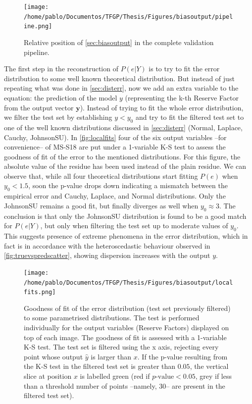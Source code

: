 \begin{figure}[!htb]
	\centering
	\texttt{[image: /home/pablo/Documentos/TFGP/Thesis/Figures/biasoutput/pipeline.png]}
	\caption{Relative position of \autoref{sec:biasoutput} in the complete validation pipeline.}
	\label{fig:boutpipeline}
\end{figure}

%
\indent The first step in the reconstruction of $P(e|Y)$ is to try to fit the error distribution to some well known theoretical distribution. But instead of just repeating what was done in \autoref{sec:disterr}, now we add an extra variable to the equation: the prediction of the model ${y}$ (representing the k-th Reserve Factor from the output vector $\mathbf{y}$). Instead of trying to fit the whole error distribution, we filter the test set by establishing ${y}<{y}_0$ and try to fit the filtered test set to one of the well known distributions discussed in \autoref{sec:disterr} (Normal, Laplace, Cauchy, JohnsonSU). In \autoref{fig:localfits} four of the six output variables --for convenience-- of MS-S18 are put under a 1-variable K-S test to assess the goodness of fit of the error to the mentioned distributions. For this figure, the absolute value of the residue has been used instead of the plain residue. We can observe that, while all four theoretical distributions start fitting $P(e)$ when ${y}_0<1.5$, soon the p-value drops down indicating a mismatch between the empirical error and Cauchy, Laplace, and Normal distributions. Only the JohnsonSU remains a good fit, but finally diverges as well when ${y}_0\approx3$. The conclusion is that only the JohnsonSU distribution is found to be a good match for $P(e|Y)$, but only when filtering the test set up to moderate values of ${y}_0$. This suggests presence of extreme phenomena in the error distribution, which in fact is in accordance with the heteroscedastic behaviour observed in \autoref{fig:truevspredscatter}, showing dispersion increases with the output ${y}$.\\
%
\begin{figure}[!htb]
	\centering
	\texttt{[image: /home/pablo/Documentos/TFGP/Thesis/Figures/biasoutput/localfits.png]}
	\caption{Goodness of fit of the error distribution (test set previously filtered) to some parametrised distributions. The test is performed individually for the output variables (Reserve Factors) displayed on top of each image. The goodness of fit is assessed with a 1-variable K-S test. The test set is filtered using the x axis, rejecting every point whose output $\hat{y}$ is larger than $x$. If the p-value resulting from the K-S test in the filtered test set is greater than $0.05$, the vertical slice at position $x$ is labelled green (red if $p\text{-value}<0.05$, grey if less than a threshold number of points --namely, 30-- are present in the filtered test set).}
	\label{fig:localfits}
\end{figure}
